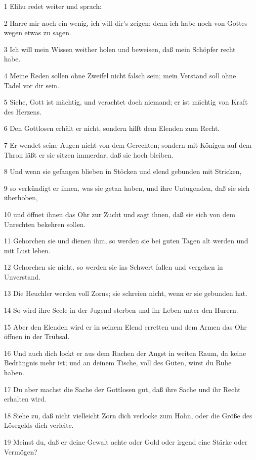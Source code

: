 \par 1 Elihu redet weiter und sprach:
\par 2 Harre mir noch ein wenig, ich will dir's zeigen; denn ich habe noch von Gottes wegen etwas zu sagen.
\par 3 Ich will mein Wissen weither holen und beweisen, daß mein Schöpfer recht habe.
\par 4 Meine Reden sollen ohne Zweifel nicht falsch sein; mein Verstand soll ohne Tadel vor dir sein.
\par 5 Siehe, Gott ist mächtig, und verachtet doch niemand; er ist mächtig von Kraft des Herzens.
\par 6 Den Gottlosen erhält er nicht, sondern hilft dem Elenden zum Recht.
\par 7 Er wendet seine Augen nicht von dem Gerechten; sondern mit Königen auf dem Thron läßt er sie sitzen immerdar, daß sie hoch bleiben.
\par 8 Und wenn sie gefangen blieben in Stöcken und elend gebunden mit Stricken,
\par 9 so verkündigt er ihnen, was sie getan haben, und ihre Untugenden, daß sie sich überhoben,
\par 10 und öffnet ihnen das Ohr zur Zucht und sagt ihnen, daß sie sich von dem Unrechten bekehren sollen.
\par 11 Gehorchen sie und dienen ihm, so werden sie bei guten Tagen alt werden und mit Lust leben.
\par 12 Gehorchen sie nicht, so werden sie ins Schwert fallen und vergehen in Unverstand.
\par 13 Die Heuchler werden voll Zorns; sie schreien nicht, wenn er sie gebunden hat.
\par 14 So wird ihre Seele in der Jugend sterben und ihr Leben unter den Hurern.
\par 15 Aber den Elenden wird er in seinem Elend erretten und dem Armen das Ohr öffnen in der Trübsal.
\par 16 Und auch dich lockt er aus dem Rachen der Angst in weiten Raum, da keine Bedrängnis mehr ist; und an deinem Tische, voll des Guten, wirst du Ruhe haben.
\par 17 Du aber machst die Sache der Gottlosen gut, daß ihre Sache und ihr Recht erhalten wird.
\par 18 Siehe zu, daß nicht vielleicht Zorn dich verlocke zum Hohn, oder die Größe des Lösegelds dich verleite.
\par 19 Meinst du, daß er deine Gewalt achte oder Gold oder irgend eine Stärke oder Vermögen?
